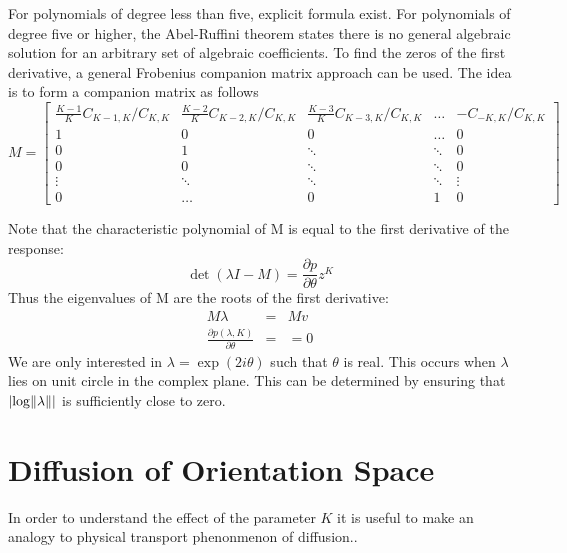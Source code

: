 \documentclass{article}
\DeclarePairedDelimiter\abs{\lvert}{\rvert}%
\DeclarePairedDelimiter\norm{\lVert}{\rVert}%
\begin{document}
For polynomials of degree less than five, explicit formula exist. For polynomials of degree five or higher, the Abel-Ruffini theorem states there is no general algebraic solution for an arbitrary set of algebraic coefficients.
To find the zeros of the first derivative, a general Frobenius companion matrix approach can be used. The idea is to form a companion matrix as follows
\[
	M = \begin{bmatrix}
		\frac{K-1}{K} C_{K-1,K}/C_{K,K}  & \frac{K-2}{K} C_{K-2,K}/C_{K,K} & \frac{K-3}{K} C_{K-3,K}/C_{K,K} & \dots & -C_{-K,K}/C_{K,K} \\
		1                  & 0                 & 0                 & \dots & 0 \\
		0                  & 1                 & \ddots            & \ddots & 0 \\
		0                  & 0                 & \ddots            & \ddots & 0 \\
		\vdots             & \ddots            & \ddots            & \ddots& \vdots \\
		0                  & \dots                 & 0                 & 1     & 0 
	\end{bmatrix}
\]

Note that the characteristic polynomial of M is equal to the first derivative of the response:
\[ \det(\lambda I - M ) = \frac{\partial p}{\partial \theta} z^{K} \]
Thus the eigenvalues of M are the roots of the first derivative:
\begin{eqnarray}
	M \lambda & = & M v \\
	\frac{\partial p(\lambda,K)}{\partial \theta} & = & =0
\end{eqnarray}
We are only interested in $ \lambda = \exp(2i\theta) $ such that $ \theta $ is real. This occurs when $ \lambda $ lies on unit circle in the complex plane. This can be determined by ensuring that $ \abs{ \log \norm{\lambda} } $ is sufficiently close to zero.



\section{Diffusion of Orientation Space}

In order to understand the effect of the parameter $ K $ it is useful to make an analogy to physical transport phenonmenon of diffusion..
\end{document}
